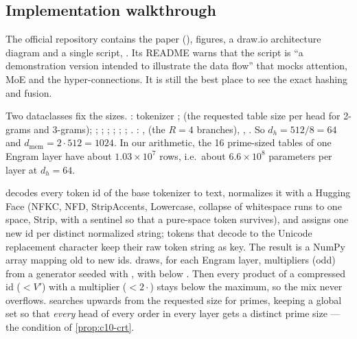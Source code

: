 \subsection{Implementation walkthrough}\label{sec:c10-engram-code}

The official repository  contains the paper
(), figures, a draw.io architecture diagram and
a single script, . Its README warns that the
script is ``a demonstration version intended to illustrate the data flow'' that mocks attention,
MoE and the hyper-connections. It is still the best place to see the exact hashing and fusion.

\begin{implnote}[title={In the code: configuration}]
Two dataclasses fix the sizes. : tokenizer ;
 (the requested table size per head for 2-grams and
3-grams); ; ; ;
; ; ; .
: ,  (the $R = 4$ branches),
, . So $d_h = 512/8 = 64$ and
$d_{\mathrm{mem}} = 2 \cdot 512 = 1024$. In our arithmetic, the 16 prime-sized tables of one Engram
layer have about $1.03 \times 10^7$ rows, i.e.\ about $6.6 \times 10^8$ parameters per layer at
$d_h = 64$.
\end{implnote}

\begin{implnote}[title={In the code: tokenizer compression and hash parameters}]
 decodes every token id of the base tokenizer to text, normalizes it
with a Hugging Face  (NFKC, NFD, StripAccents, Lowercase, collapse of
whitespace runs to one space, Strip, with a sentinel so that a pure-space token survives), and
assigns one new id per distinct normalized string; tokens that decode to the Unicode replacement
character keep their raw token string as key. The result is a NumPy array 
mapping old to new ids.  draws, for each Engram layer, multipliers
 (odd) from a generator seeded with , with
 below . Then every product of a compressed id
($< V'$) with a multiplier ($< 2\cdot$) stays below the  maximum,
so the mix never overflows.  searches upwards from the
requested size for primes, keeping a global  set so that \emph{every} head of
every order in every layer gets a distinct prime size --- the condition of \cref{prop:c10-crt}.
\end{implnote}

